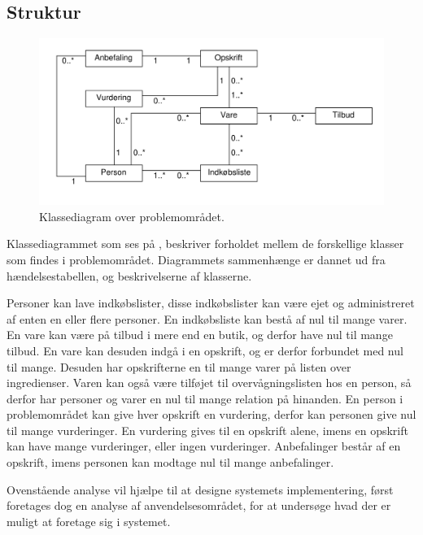 \subsection{Struktur}\label{sec:struktur}
\begin{figure}
	\centering
		\includegraphics[scale=0.6]{images/Diagrams/klassediagram_model_simple.pdf}
	\caption{Klassediagram over problemområdet.}
	\label{figur:PDklasse}
\end{figure}

Klassediagrammet som ses på , beskriver forholdet mellem de forskellige klasser som findes i problemområdet.
Diagrammets sammenhænge er dannet ud fra hændelsestabellen, og beskrivelserne af klasserne.

Personer kan lave indkøbslister, disse indkøbslister kan være ejet og administreret af enten en eller flere personer.
En indkøbsliste kan bestå af nul til mange varer.
En vare kan være på tilbud i mere end en butik, og derfor have nul til mange tilbud.
En vare kan desuden indgå i en opskrift, og er derfor forbundet med nul til mange.
Desuden har opskrifterne en til mange varer på listen over ingredienser.
Varen kan også være tilføjet til overvågningslisten hos en person, så derfor har personer og varer en nul til mange relation på hinanden.
En person i problemområdet kan give hver opskrift en vurdering, derfor kan personen give nul til mange vurderinger.
En vurdering gives til en opskrift alene, imens en opskrift kan have mange vurderinger, eller ingen vurderinger.
Anbefalinger består af en opskrift, imens personen kan modtage nul til mange anbefalinger.

Ovenstående analyse vil hjælpe til at designe systemets implementering, først foretages dog en analyse af anvendelsesområdet, for at undersøge hvad der er muligt at foretage sig i systemet.
